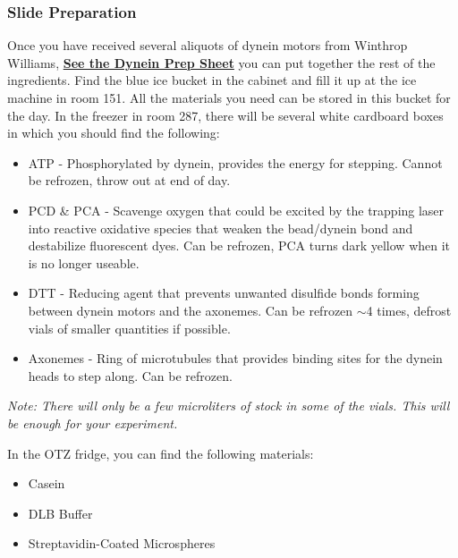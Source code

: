 \documentclass{../lab}
\begin{document}
\subsubsection{Slide Preparation}

Once you have received several aliquots of dynein motors from Winthrop Williams, \href{https://berkeley-physics111b.github.io/assets/pdf/oldwebsitestructure/images/Dynein\_OTZ\_Slide\_Prep-Yildiz\_Lab.pdf}{\textbf{See the Dynein Prep Sheet}} you can put together the rest of the ingredients. Find the blue ice bucket in the cabinet and fill it up at the ice machine in room 151. All the materials you need can be stored in this bucket for the day. In the freezer in room 287, there will be several white cardboard boxes in which you should find the following:

\begin{itemize}
    \item ATP - Phosphorylated by dynein, provides the energy for stepping. Cannot be refrozen, throw out at end of day.

    \item PCD \& PCA - Scavenge oxygen that could be excited by the trapping laser into reactive oxidative species that weaken the bead/dynein bond and destabilize fluorescent dyes. Can be refrozen, PCA turns dark yellow when it is no longer useable.

    \item DTT - Reducing agent that prevents unwanted disulfide bonds forming between dynein motors and the axonemes. Can be refrozen $\sim$4 times, defrost vials of smaller quantities if possible.

    \item Axonemes - Ring of microtubules that provides binding sites for the dynein heads to step along. Can be refrozen.

\end{itemize}

\emph{Note: There will only be a few microliters of stock in some of the vials. This will be enough for your experiment.}

In the OTZ fridge, you can find the following materials:

\begin{itemize}
    \item Casein

    \item DLB Buffer

    \item Streptavidin-Coated Microspheres

\end{itemize}
\end{document}
